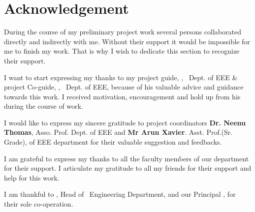 %
%
%
%
%
%

\chapter*{\centering Acknowledgement}
%


\par
\hspace{0.9cm}During the course of my preliminary project work several persons collaborated directly and indirectly with me. Without their support it would be impossible for me to finish my work. That is why I wish to dedicate this section to recognize their support.
\vspace {.2cm}
\par
\hspace{.35cm}I want to start expressing my thanks to my project guide, {\bf \vguide}, \vguidedg\ Dept. of EEE \& project Co-guide, {\bf \vcoguide}, \vcoguidedg\ Dept. of EEE, because of his valuable advice and guidance towards this work. I received motivation, encouragement and hold up from his during the course of work.

\vspace{0.2cm}
\par
\hspace{0.35cm}I would like to express my sincere gratitude to project coordinators \textbf{Dr. Neenu Thomas}, Asso. Prof. Dept. of EEE and \textbf{Mr Arun Xavier}. Asst. Prof.(Sr. Grade), of EEE department for their valuable suggestion and feedbacks.

\vspace{0.2cm}
\par
\hspace{0.35cm}I am grateful to express my thanks to all the faculty members of our  department for their support. I articulate my gratitude to all my friends  for their support and help for this work.

\vspace{.2cm}
\par 
\hspace{.35cm}I am thankful to {\bf \vhod}, 
Head of \vdept\ Engineering Department, and our Principal {\bf \vprincipal}, for their sole co-operation.




